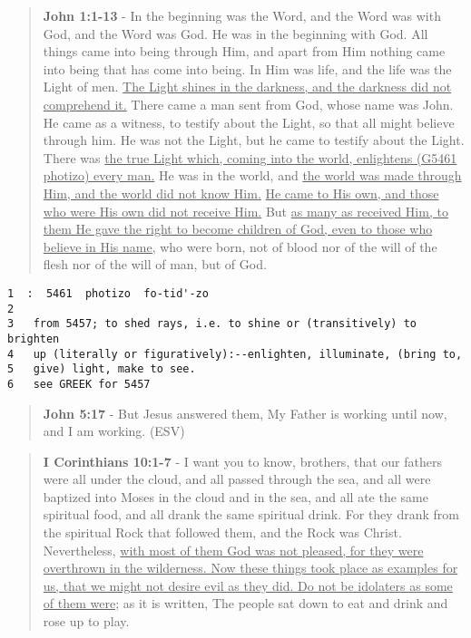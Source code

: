 \documentclass[11pt]{article}
\begin{document}
\begin{quote}
\textbf{John 1:1-13} - In the beginning was the Word, and the Word was with God, and the Word was God. He was in the beginning with God. All things came into being through Him, and apart from Him nothing came into being that has come into being. In Him was life, and the life was the Light of men. \uline{The Light shines in the darkness, and the darkness did not comprehend it.} There came a man sent from God, whose name was John. He came as a witness, to testify about the Light, so that all might believe through him. He was not the Light, but he came to testify about the Light. There was \uline{the true Light which, coming into the world, enlightens (G5461 photizo) every man.} He was in the world, and \uline{the world was made through Him, and the world did not know Him.} \uline{He came to His own, and those who were His own did not receive Him.} But \uline{as many as received Him, to them He gave the right to become children of God, even to those who believe in His name,} who were born, not of blood nor of the will of the flesh nor of the will of man, but of God.
\end{quote}

\begin{verbatim}
1  :  5461  photizo  fo-tid'-zo
2  
3   from 5457; to shed rays, i.e. to shine or (transitively) to brighten
4   up (literally or figuratively):--enlighten, illuminate, (bring to,
5   give) light, make to see.
6   see GREEK for 5457
\end{verbatim}

\begin{quote}
\textbf{John 5:17} - But Jesus answered them, My Father is working until now, and I am working. (ESV)
\end{quote}

\begin{quote}
\textbf{I Corinthians 10:1-7} - I want you to know, brothers, that our fathers were all under the cloud, and all passed through the sea, and all were baptized into Moses in the cloud and in the sea, and all ate the same spiritual food, and all drank the same spiritual drink. For they drank from the spiritual Rock that followed them, and the Rock was Christ. Nevertheless, \uline{with most of them God was not pleased, for they were overthrown in the wilderness. Now these things took place as examples for us, that we might not desire evil as they did. Do not be idolaters as some of them were;} as it is written, The people sat down to eat and drink and rose up to play.
\end{quote}
\end{document}
